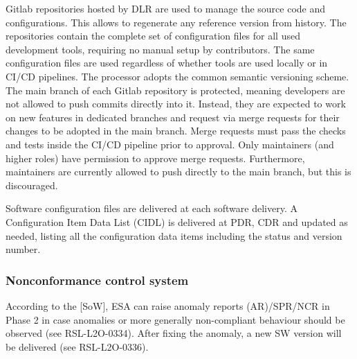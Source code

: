 %
%
%
%
%

Gitlab repositories hosted by DLR are used to manage the source code and configurations. This allows to regenerate any reference version from history. The repositories contain the complete set of configuration files for all used development tools, requiring no manual setup by contributors. The same configuration files are used regardless of whether tools are used locally or in CI/CD pipelines. The processor adopts the common semantic versioning scheme. The main branch of each Gitlab repository is protected, meaning developers are not allowed to push commits directly into it. Instead, they are expected to work on new features in dedicated branches and request via merge requests for their changes to be adopted in the main branch. Merge requests must pass the checks and tests inside the CI/CD pipeline prior to approval. Only maintainers (and higher roles) have permission to approve merge requests. Furthermore, maintainers are currently allowed to push directly to the main branch, but this is discouraged.

Software configuration files are delivered at each software delivery. A Configuration Item Data List (CIDL) is delivered at PDR, CDR and updated as needed, listing all the configuration data items including the status and version number.

\subsubsection{Nonconformance control system}


According to the [SoW], ESA can raise anomaly reports (AR)/SPR/NCR in Phase 2 in case anomalies or more generally non-compliant behaviour
should be observed (see RSL-L2O-0334). After fixing the anomaly, a new SW version will be delivered (see RSL-L2O-0336).

